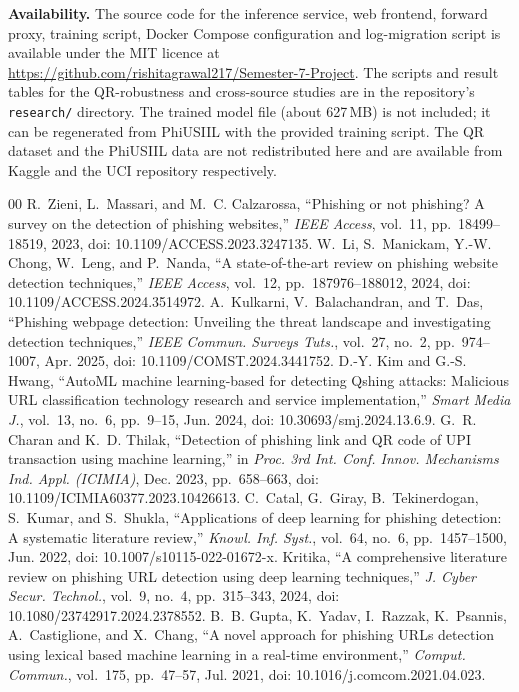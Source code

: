 \documentclass[conference]{IEEEtran}
\begin{document}
\textbf{Availability.} The source code for the inference service, web frontend, forward proxy,
training script, Docker Compose configuration and log-migration script is available under the MIT
licence at \url{https://github.com/rishitagrawal217/Semester-7-Project}. The scripts and result
tables for the QR-robustness and cross-source studies are in the repository's \texttt{research/}
directory. The trained model file (about 627\,MB) is not included; it can be regenerated from
PhiUSIIL with the provided training script. The QR dataset and the PhiUSIIL data are not
redistributed here and are available from Kaggle and the UCI repository respectively.

\balance
\begin{thebibliography}{00}
 R.~Zieni, L.~Massari, and M.~C. Calzarossa, ``Phishing or not phishing? A survey on the detection of phishing websites,'' \textit{IEEE Access}, vol.~11, pp.~18499--18519, 2023, doi: 10.1109/ACCESS.2023.3247135.
 W.~Li, S.~Manickam, Y.-W. Chong, W.~Leng, and P.~Nanda, ``A state-of-the-art review on phishing website detection techniques,'' \textit{IEEE Access}, vol.~12, pp.~187976--188012, 2024, doi: 10.1109/ACCESS.2024.3514972.
 A.~Kulkarni, V.~Balachandran, and T.~Das, ``Phishing webpage detection: Unveiling the threat landscape and investigating detection techniques,'' \textit{IEEE Commun. Surveys Tuts.}, vol.~27, no.~2, pp.~974--1007, Apr. 2025, doi: 10.1109/COMST.2024.3441752.
 D.-Y. Kim and G.-S. Hwang, ``AutoML machine learning-based for detecting Qshing attacks: Malicious URL classification technology research and service implementation,'' \textit{Smart Media J.}, vol.~13, no.~6, pp.~9--15, Jun. 2024, doi: 10.30693/smj.2024.13.6.9.
 G.~R. Charan and K.~D. Thilak, ``Detection of phishing link and QR code of UPI transaction using machine learning,'' in \textit{Proc. 3rd Int. Conf. Innov. Mechanisms Ind. Appl. (ICIMIA)}, Dec. 2023, pp.~658--663, doi: 10.1109/ICIMIA60377.2023.10426613.
 C.~Catal, G.~Giray, B.~Tekinerdogan, S.~Kumar, and S.~Shukla, ``Applications of deep learning for phishing detection: A systematic literature review,'' \textit{Knowl. Inf. Syst.}, vol.~64, no.~6, pp.~1457--1500, Jun. 2022, doi: 10.1007/s10115-022-01672-x.
 Kritika, ``A comprehensive literature review on phishing URL detection using deep learning techniques,'' \textit{J. Cyber Secur. Technol.}, vol.~9, no.~4, pp.~315--343, 2024, doi: 10.1080/23742917.2024.2378552.
 B.~B. Gupta, K.~Yadav, I.~Razzak, K.~Psannis, A.~Castiglione, and X.~Chang, ``A novel approach for phishing URLs detection using lexical based machine learning in a real-time environment,'' \textit{Comput. Commun.}, vol.~175, pp.~47--57, Jul. 2021, doi: 10.1016/j.comcom.2021.04.023.

\end{thebibliography}
\end{document}
